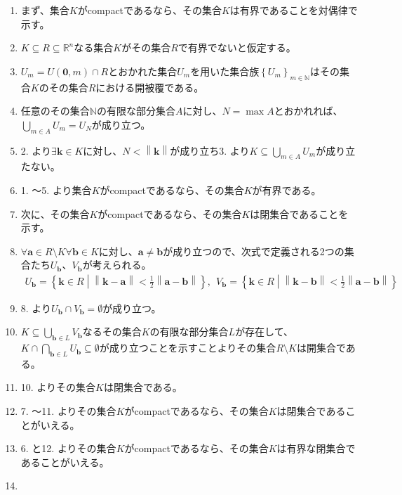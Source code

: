 \documentclass[dvipdfmx]{jsarticle}
\begin{document}
\begin{enumerate}
\item
  まず、集合$K$がcompactであるなら、その集合$K$は有界であることを対偶律で示す。
\item
  $K \subseteq R \subseteq \mathbb{R}^{n}$なる集合$K$がその集合$R$で有界でないと仮定する。
\item
  $U_{m} = U\left( \mathbf{0},m \right) \cap R$とおかれた集合$U_{m}$を用いた集合族$\left\{ U_{m} \right\}_{m \in \mathbb{N}}$はその集合$K$のその集合$R$における開被覆である。
\item
  任意のその集合$\mathbb{N}$の有限な部分集合$A$に対し、$N = \max A$とおかれれば、$\bigcup_{m \in A} U_{m} = U_{N}$が成り立つ。
\item
  2. より$\exists\mathbf{k} \in K$に対し、$N < \left\| \mathbf{k} \right\|$が成り立ち3. より$K \subseteq \bigcup_{m \in A} U_{m}$が成り立たない。
\item
  1. ～5. より集合$K$がcompactであるなら、その集合$K$が有界である。
\item
  次に、その集合$K$がcompactであるなら、その集合$K$は閉集合であることを示す。
\item
  $\forall\mathbf{a} \in R \setminus K\forall\mathbf{b} \in K$に対し、$\mathbf{a} \neq \mathbf{b}$が成り立つので、次式で定義される2つの集合たち$U_{\mathbf{b}}$、$V_{\mathbf{b}}$が考えられる。
\begin{align*}
U_{\mathbf{b}} = \left\{ \mathbf{k} \in R \middle| \left\| \mathbf{k} - \mathbf{a} \right\| < \frac{1}{2}\left\| \mathbf{a} - \mathbf{b} \right\| \right\},\ \ V_{\mathbf{b}} = \left\{ \mathbf{k} \in R \middle| \left\| \mathbf{k} - \mathbf{b} \right\| < \frac{1}{2}\left\| \mathbf{a} - \mathbf{b} \right\| \right\}
\end{align*}
\item
  8. より$U_{\mathbf{b}} \cap V_{\mathbf{b}} = \emptyset$が成り立つ。
\item
  $K \subseteq \bigcup_{\mathbf{b} \in L} V_{\mathbf{b}}$なるその集合$K$の有限な部分集合$L$が存在して、$K \cap \bigcap_{\mathbf{b} \in L} U_{\mathbf{b}} \subseteq \emptyset$が成り立つことを示すことよりその集合$R \setminus K$は開集合である。
\item
  10. よりその集合$K$は閉集合である。
\item
  7. ～11. よりその集合$K$がcompactであるなら、その集合$K$は閉集合であることがいえる。
\item
  6. と12. よりその集合$K$がcompactであるなら、その集合$K$は有界な閉集合であることがいえる。
\item

\end{enumerate}
\end{document}

